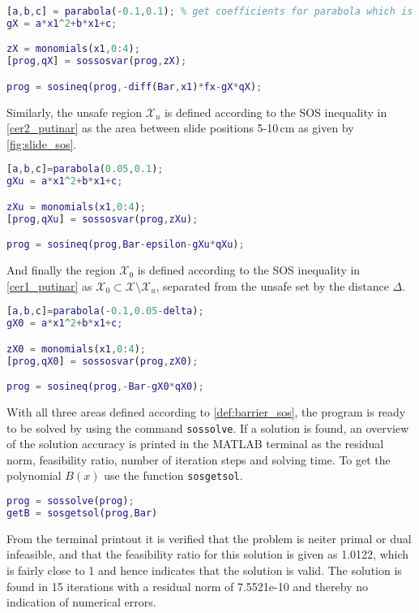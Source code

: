 \begin{lstlisting}[language=matlab]
% Define space X in Rn
[a,b,c] = parabola(-0.1,0.1); % get coefficients for parabola which is positive for x in [-0.1,0.1] m
gX = a*x1^2+b*x1+c;

zX = monomials(x1,0:4);
[prog,qX] = sossosvar(prog,zX);

prog = sosineq(prog,-diff(Bar,x1)*fx-gX*qX);
\end{lstlisting}
Similarly, the unsafe region $\mathcal{X}_u$ is defined according to the SOS inequality in \autoref{cer2_putinar} as the area between slide positions 5-10\,cm as given by \autoref{fig:slide_sos}.
\begin{lstlisting}[language=matlab]
% Define space Xu in X
[a,b,c]=parabola(0.05,0.1);
gXu = a*x1^2+b*x1+c;

zXu = monomials(x1,0:4);
[prog,qXu] = sossosvar(prog,zXu);

prog = sosineq(prog,Bar-epsilon-gXu*qXu);
\end{lstlisting}
And finally the region $\mathcal{X}_0$ is defined according to the SOS inequality in \autoref{cer1_putinar} as $\mathcal{X}_0\subset\mathcal{X}\setminus\mathcal{X}_u$, separated from the unsafe set by the distance $\Delta$.
\begin{lstlisting}[language=matlab]
% Define space X0 in X
[a,b,c]=parabola(-0.1,0.05-delta);
gX0 = a*x1^2+b*x1+c;

zX0 = monomials(x1,0:4);
[prog,qX0] = sossosvar(prog,zX0);

prog = sosineq(prog,-Bar-gX0*qX0);
\end{lstlisting}
With all three areas defined according to \autoref{def:barrier_sos}, the program is ready to be solved by using the command \texttt{sossolve}. If a solution is found, an overview of the solution accuracy is printed in the MATLAB terminal as the residual norm, feasibility ratio, number of iteration steps and solving time. To get the polynomial $B(x)$ use the function \texttt{sosgetsol}.
\begin{lstlisting}[language=matlab]
% Solve for barrier certificate
prog = sossolve(prog);
getB = sosgetsol(prog,Bar)
\end{lstlisting}

\vspace{-2mm}
From the terminal printout it is verified that the problem is neiter primal or dual infeasible, and that the feasibility ratio for this solution is given as 1.0122, which is fairly close to 1 and hence indicates that the solution is valid. The solution is found in 15 iterations with a residual norm of 7.5521e-10 and thereby no indication of numerical errors.

